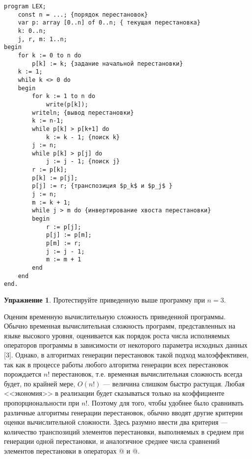 \documentclass[12pt,a4paper]{article}
\theoremstyle{plain}
\theoremstyle{definition}
\newtheorem*{task}{Упражнение}
\theoremstyle{remark}
\newtheorem*{comment}{Комментарий}
\begin{document}
\begin{verbatim}
program LEX;
    const n = ...; {порядок перестановок}
    var p: array [0..n] of 0..n; { текущая перестановка}
    k: 0..n;
    j, r, m: 1..n;
begin
    for k := 0 to n do
        p[k] := k; {задание начальной перестановки}
    k := 1;
    while k <> 0 do
    begin
        for k := 1 to n do
            write(p[k]);
        writeln; {вывод перестановки}
        k := n-1;
        while p[k] > p[k+1] do
            k := k - 1; {поиcк k}
        j := n;
        while p[k] > p[j] do
            j := j - 1; {поиск j}
        r := p[k];
        p[k] := p[j];
        p[j] := r; {транспозиция $p_k$ и $p_j$ }
        j := n;
        m := k + 1;
        while j > m do {инвертирование хвоста перестановки}
        begin
            r := p[j];
            p[j] := p[m];
            p[m] := r;
            j := j - 1;
            m := m + 1
        end
    end
end.
\end{verbatim}

\begin{comment}
Нулевой элемент включен в массив $p$ для того, чтобы обеспечить конец цикла \verb@{поиск k}@ после генерации последней перестановки.
\end{comment}

\begin{task}
Протестируйте приведенную выше программу при $n=3$.
\end{task}

Оценим временную вычислительную сложность приведенной программы. Обычно временная вычислительная сложность программ, представленных на языке высокого уровня, оценивается как порядок роста числа исполняемых операторов программы в зависимости от некоторого параметра исходных данных [3]. Однако, в алгоритмах генерации перестановок такой подход малоэффективен, так как в процессе работы любого алгоритма генерации всех перестановок порождается $n!$ перестановок, т.е. временная вычислительная сложность всегда будет, по крайней мере, $O(n!)$ --- величина слишком быстро растущая. Любая <<экономия>> в реализации будет сказываться только на коэффициенте пропорциональности при $n!$. Поэтому для того, чтобы удобнее было сравнивать различные алгоритмы генерации перестановок, обычно вводят другие критерии оценки вычислительной сложности. Здесь разумно ввести два критерия --- количество транспозиций элементов перестановки, выполняемых в среднем при генерации одной перестановки, и аналогичное среднее числа сравнений элементов перестановки в операторах @ и @.
\end{document}
